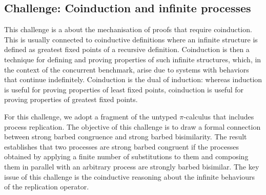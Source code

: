 \subsection{Challenge: Coinduction and infinite processes}
\label{sec:challenge:coinduction}


This challenge is a about the mechanisation of proofs
that require coinduction.
%
This is usually connected to coinductive definitions where an infinite
structure is defined as greatest fixed points of a recursive
definition.
%
Coinduction is then a technique for defining and proving properties of
such infinite structures,
%
which, in the context of the concurrent benchmark, arise
due to systems with behaviors that continue indefinitely.
%
Coinduction is the dual of induction: whereas induction is useful for
proving properties of least fixed points, coinduction is useful for
proving properties of greatest fixed points.
%
%

For this challenge, we adopt a fragment of the untyped $\pi$-calculus
that includes process replication.
The objective of this challenge is to %
draw a formal connection between strong barbed congruence and strong
barbed bisimilarity.  %
The result establishes that two processes are strong barbed congruent
if the processes obtained by applying a finite number of substitutions to
them and composing them in parallel with an arbitrary process are
strongly barbed bisimilar.
The key issue of this challenge is the coinductive reasoning about the infinite behaviours of the replication operator.


